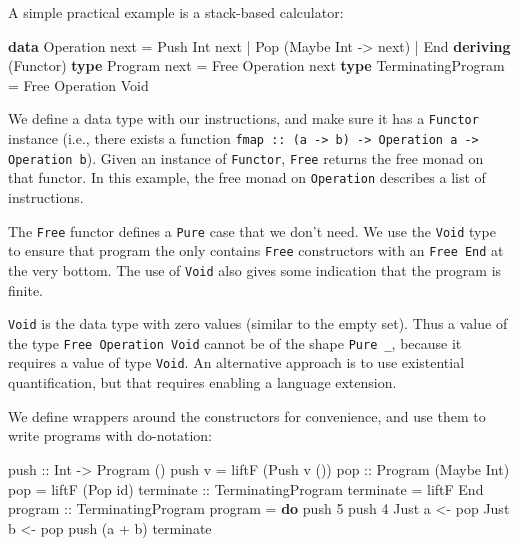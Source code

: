 \documentclass[runningheads,plain]{llncs}
\newcommand{\checkthis}[1]{#1}
\newenvironment{Shaded}{}{}
\newcommand{\KeywordTok}[1]{\textcolor[rgb]{0.00,0.44,0.13}{\textbf{#1}}}
\newcommand{\DataTypeTok}[1]{\textcolor[rgb]{0.56,0.13,0.00}{#1}}
\newcommand{\DecValTok}[1]{\textcolor[rgb]{0.25,0.63,0.44}{#1}}
\newcommand{\OtherTok}[1]{\textcolor[rgb]{0.00,0.44,0.13}{#1}}
\newcommand{\FunctionTok}[1]{\textcolor[rgb]{0.02,0.16,0.49}{#1}}
\newcommand{\NormalTok}[1]{#1}
\begin{document}
A simple practical example is a stack-based calculator:
\begin{Shaded}
\begin{Highlighting}[]
\KeywordTok{data} \DataTypeTok{Operation}\NormalTok{ next  }
    \FunctionTok{=} \DataTypeTok{Push} \DataTypeTok{Int}\NormalTok{ next}
    \FunctionTok{|} \DataTypeTok{Pop}\NormalTok{ (}\DataTypeTok{Maybe} \DataTypeTok{Int} \OtherTok{->}\NormalTok{ next) }
    \FunctionTok{|} \DataTypeTok{End}
    \KeywordTok{deriving}\NormalTok{ (}\DataTypeTok{Functor}\NormalTok{)  }
\KeywordTok{type} \DataTypeTok{Program}\NormalTok{ next }\FunctionTok{=} \DataTypeTok{Free} \DataTypeTok{Operation}\NormalTok{ next}
\KeywordTok{type} \DataTypeTok{TerminatingProgram} \FunctionTok{=} \DataTypeTok{Free} \DataTypeTok{Operation} \DataTypeTok{Void}
\end{Highlighting}
\end{Shaded}

We define a data type with our instructions, and make sure it has a \texttt{Functor} instance (i.e., there exists a function \texttt{fmap :: (a -> b) -> Operation a -> Operation b}).
Given an instance of \texttt{Functor}, \texttt{Free} returns the free monad on that functor. 
\checkthis{In this example, the free monad on \texttt{Operation} describes a list of instructions.} 

The \texttt{Free} functor defines a \texttt{Pure} case that we don't need.
We use the \texttt{Void} type to ensure that program the only contains \texttt{Free} constructors with an \texttt{Free End} at the very bottom. 
The use of \texttt{Void} also gives some indication that the program is finite. 

\texttt{Void} is the data type with zero values (similar to the empty set). Thus a value of the type
\texttt{Free\ Operation\ Void} cannot be of the shape \texttt{Pure\ \_}, because it requires a value of type \texttt{Void}.
An alternative approach is to use existential quantification, but that requires enabling a language extension.

We define wrappers around the constructors for convenience,
and use them to write programs with do-notation:
\begin{Shaded}
\begin{Highlighting}[]
\OtherTok{push ::} \DataTypeTok{Int} \OtherTok{->} \DataTypeTok{Program}\NormalTok{ ()}
\NormalTok{push v }\FunctionTok{=}\NormalTok{ liftF (}\DataTypeTok{Push}\NormalTok{ v ())   }
\OtherTok{pop ::} \DataTypeTok{Program}\NormalTok{ (}\DataTypeTok{Maybe} \DataTypeTok{Int}\NormalTok{) }
\NormalTok{pop }\FunctionTok{=}\NormalTok{ liftF (}\DataTypeTok{Pop}\NormalTok{ id)}
\OtherTok{terminate ::} \DataTypeTok{TerminatingProgram}  
\NormalTok{terminate }\FunctionTok{=}\NormalTok{ liftF }\DataTypeTok{End}
\OtherTok{program ::} \DataTypeTok{TerminatingProgram}  
\NormalTok{program }\FunctionTok{=} \KeywordTok{do}    
\NormalTok{    push }\DecValTok{5}  
\NormalTok{    push }\DecValTok{4}  
    \DataTypeTok{Just}\NormalTok{ a }\OtherTok{<-}\NormalTok{ pop    }
    \DataTypeTok{Just}\NormalTok{ b }\OtherTok{<-}\NormalTok{ pop    }
\NormalTok{    push (a }\FunctionTok{+}\NormalTok{ b)    }
\NormalTok{    terminate}
\end{Highlighting}
\end{Shaded}
\end{document}
